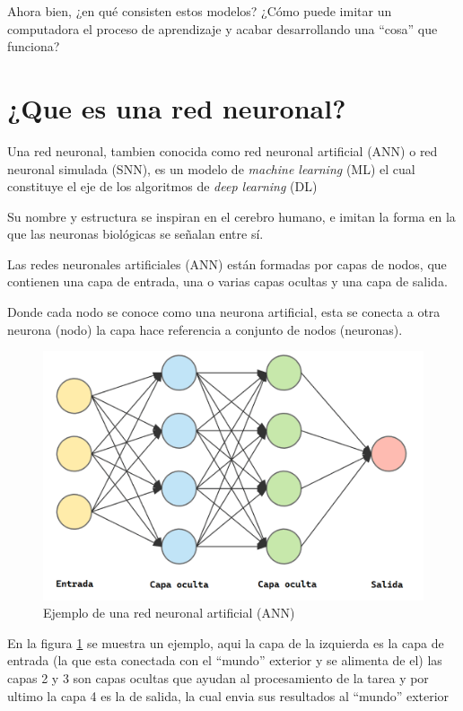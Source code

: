 \documentclass[runningheads]{llncs} %
\begin{document}
Ahora bien, ¿en qué consisten estos modelos? ¿Cómo puede imitar un computadora 
el proceso de aprendizaje y acabar desarrollando una
\textquotedblleft{cosa}\textquotedblright{} que funciona? \cite{int2}
\section{¿Que es una red neuronal?}
Una red neuronal, tambien conocida como red neuronal artificial (ANN)
o red neuronal simulada (SNN), es un modelo de \textit{machine learning} (ML)
el cual constituye el eje de los algoritmos de \textit{deep learning} (DL) 

Su nombre y estructura se inspiran en el cerebro humano, 
e imitan la forma en la que las neuronas biológicas se señalan entre sí.

Las redes neuronales artificiales (ANN) están formadas por capas de nodos, 
que contienen una capa de entrada, una o varias capas ocultas y una capa de salida.
\cite{def-ibm1}

Donde cada nodo se conoce como una neurona artificial, esta se conecta a 
otra neurona (nodo) la capa hace referencia a conjunto de nodos (neuronas).

\begin{figure}
    \centering
    \includegraphics[scale=0.4]{red_neuronal_artificial.png}
    \caption{Ejemplo de una red neuronal artificial (ANN) \cite{int1}}
    \label{fig:red_neuronal_artificial}
\end{figure}

En la figura \ref{fig:red_neuronal_artificial} se muestra un ejemplo,
aqui la capa de la izquierda es la capa de entrada (la que esta
conectada con el \textquotedblleft{mundo}\textquotedblright{} exterior y se alimenta de el)
las capas 2 y 3 son capas ocultas que ayudan al procesamiento
de la tarea y por ultimo la capa 4 es la de salida, la cual
envia sus resultados al \textquotedblleft{mundo}\textquotedblright{} exterior
\end{document}
